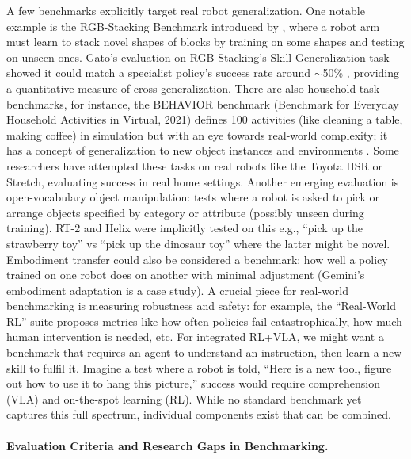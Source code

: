 A few benchmarks explicitly target real robot generalization. One notable example is the RGB-Stacking Benchmark introduced by \textcite{PICKPL2021}, where a robot arm must learn to stack novel shapes of blocks by training on some shapes and testing on unseen ones. Gato’s evaluation on RGB-Stacking’s Skill Generalization task showed it could match a specialist policy’s success rate around $\sim$50\% \cite{GATO2022}, providing a quantitative measure of cross-generalization. There are also household task benchmarks, for instance, the BEHAVIOR benchmark (Benchmark for Everyday Household Activities in Virtual, 2021) defines 100 activities (like cleaning a table, making coffee) in simulation but with an eye towards real-world complexity; it has a concept of generalization to new object instances and environments \cite{BEHAV2021}. Some researchers have attempted these tasks on real robots like the Toyota HSR or Stretch, evaluating success in real home settings. Another emerging evaluation is open-vocabulary object manipulation: tests where a robot is asked to pick or arrange objects specified by category or attribute (possibly unseen during training). RT-2 and Helix were implicitly tested on this e.g., ``pick up the strawberry toy'' vs ``pick up the dinosaur toy'' where the latter might be novel. Embodiment transfer could also be considered a benchmark: how well a policy trained on one robot does on another with minimal adjustment (Gemini’s embodiment adaptation is a case study). A crucial piece for real-world benchmarking is measuring robustness and safety: for example, the ``Real-World RL'' suite \cite{CHRL2019} proposes metrics like how often policies fail catastrophically, how much human intervention is needed, etc. For integrated \ac{RL}+\ac{VLA}, we might want a benchmark that requires an agent to understand an instruction, then learn a new skill to fulfil it. Imagine a test where a robot is told, ``Here is a new tool, figure out how to use it to hang this picture,'' success would require comprehension (\ac{VLA}) and on-the-spot learning (\ac{RL}). While no standard benchmark yet captures this full spectrum, individual components exist that can be combined.

\paragraph{Evaluation Criteria and Research Gaps in Benchmarking.}

